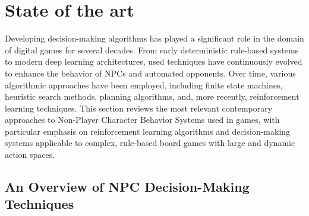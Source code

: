 \section{State of the art}
Developing decision-making algorithms has played a significant role in the domain of digital games for several decades. From early deterministic rule-based systems to modern deep learning architectures, used techniques have continuously evolved to enhance the behavior of NPCs and automated opponents. Over time, various algorithmic approaches have been employed, including finite state machines, heuristic search methods, planning algorithms, and, more recently, reinforcement learning techniques.
This section reviews the most relevant contemporary approaches to Non-Player Character Behavior Systems used in games, with particular emphasis on reinforcement learning algorithms and decision-making systems applicable to complex, rule-based board games with large and dynamic action spaces.  
\subsection{An Overview of NPC Decision-Making Techniques}
 
